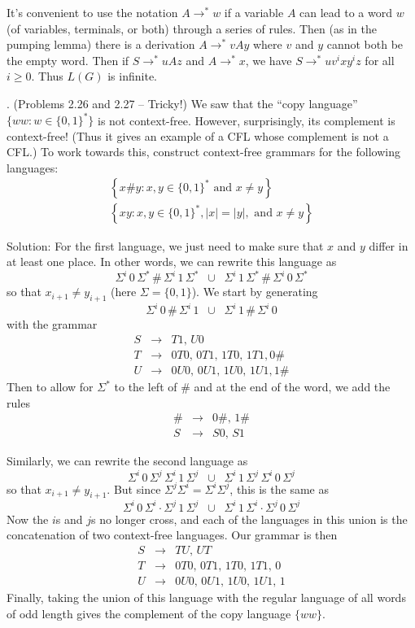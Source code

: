 \documentclass[12pt]{article}
\begin{document}
It's convenient to use the notation $A \to^* w$ if a variable $A$ can lead to a word $w$ (of variables, terminals, or both) through a series of rules.  Then (as in the pumping lemma) there is a derivation $A \to^* vAy$ where $v$ and $y$ cannot both be the empty word.  Then if $S \to^* uAz$ and $A \to^* x$, we have $S \to^* uv^ixy^iz$ for all $i \ge 0$.  Thus $L(G)$ is  infinite.

\medskip
{}. (Problems 2.26 and 2.27 -- Tricky!) We saw that the ``copy language'' $\{ ww : w \in \{0,1\}^* \}$ is not context-free.  However, surprisingly, its complement is context-free!  (Thus it gives an example of a CFL whose complement is not a CFL.)  To work towards this, construct context-free grammars for the following languages:
\[ \begin{array}{c}
\left\{ x\#y : x, y \in \{0,1\}^* \mbox{ and } x \ne y \right\} \\
\left\{ xy : x, y \in \{0,1\}^*, |x| = |y|, \mbox{ and } x \ne y \right\} 
\end{array} \]

Solution: For the first language, we just need to make sure that $x$ and $y$ differ in at least one place.  In other words, we can rewrite this language as 
\[ \Sigma^i \,0 \,\Sigma^* \,\# \,\Sigma^i \,1 \,\Sigma^* 
\;\;\cup\;\; \Sigma^i \,1 \,\Sigma^* \,\# \,\Sigma^i \,0 \,\Sigma^* \]
so that $x_{i+1} \ne y_{i+1}$ (here $\Sigma = \{0,1\}$).  We start by generating
\[ \Sigma^i \,0 \,\# \,\Sigma^i \,1 \;\;\cup\;\; \Sigma^i \,1 \,\# \,\Sigma^i \,0 \]
with the grammar
\begin{eqnarray*}
S & \to & T1, \,U0 \\
T & \to & 0T0, \,0T1, \,1T0, \,1T1, 0\# \\
U & \to & 0U0, \,0U1, \,1U0, \,1U1, 1\# 
\end{eqnarray*}
Then to allow for $\Sigma^*$ to the left of $\#$ and at the end of the word, we add the rules
\begin{eqnarray*}
\# & \to & 0\#, \,1\# \\
S & \to & S0, \,S1 
\end{eqnarray*}

Similarly, we can rewrite the second language as
\[ \Sigma^i \,0 \,\Sigma^j \,\Sigma^i \,1 \,\Sigma^j \;\;\cup\;\;
\Sigma^i \,1 \,\Sigma^j \,\Sigma^i \,0 \,\Sigma^j \]
so that $x_{i+1} \ne y_{i+1}$.  But since $\Sigma^j \Sigma^i = \Sigma^i \Sigma^j$, this is the same as
\[ \Sigma^i \,0 \,\Sigma^i \cdot \Sigma^j \,1 \,\Sigma^j \;\;\cup\;\;
\Sigma^i \,1 \,\Sigma^i \cdot \Sigma^j \,0 \,\Sigma^j \]
Now the $i$s and $j$s no longer cross, and each of the languages in this union is the concatenation of two context-free languages.  Our grammar is then
\begin{eqnarray*}
S & \to & TU, \,UT \\
T & \to & 0T0, \,0T1, \,1T0, \,1T1, \,0 \\
U & \to & 0U0, \,0U1, \,1U0, \,1U1, \,1 
\end{eqnarray*}
Finally, taking the union of this language with the regular language of all words of odd length gives the complement of the copy language $\{ww\}$.
\end{document}
